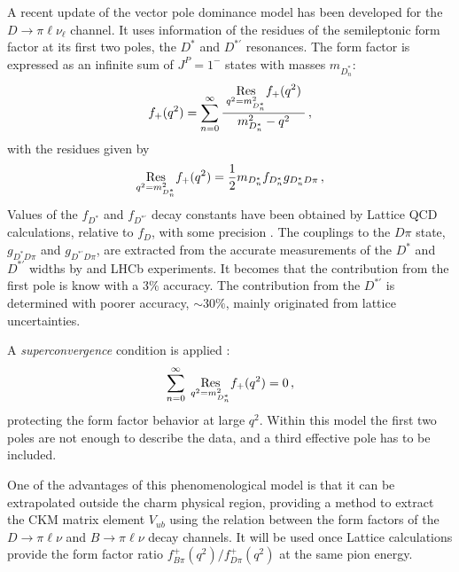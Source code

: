 A recent update of the vector pole dominance model has been developed for the $D \to \pi \ell \nu_\ell$ channel\cite{Becirevic:2014kaa}.
It uses information of the residues of the semileptonic form factor at its first two poles, the $D^\ast$ 
and $D^{\ast '}$ resonances.  
The form factor is expressed as an infinite sum of $J^P =1^-$ states with masses $m_{D^\ast_n}$: 
\begin{eqnarray}
f_+(q^2) = \sum_{n=0}^\infty { \; \displaystyle{\underset{q^2= m_{D^\ast_n}^2}{\rm Res}} f_+(q^2)\;\over m_{D^\ast_n}^2-q^2} \,,
\label{ThreePole}
\end{eqnarray}
with the residues given by 
\begin{eqnarray}
\displaystyle{\underset{q^2=m_{D_n^\ast}^2}{\rm Res}} f_+(q^2)= {1\over 2} m_{D_n^\ast} f_{D_n^\ast} g_{D_n^\ast D\pi}\,, 
\label{Residua}
\end{eqnarray}
Values of the $f_{D^\ast}$ and $f_{D^{\ast '}}$ decay constants have been obtained by Lattice QCD calculations, 
relative to $f_{D}$, with some precision  \cite{Becirevic:2014kaa}. 
The couplings to the $D\pi$ state, $g_{D^\ast D\pi}$ and $g_{D^{\ast '} D\pi}$, are extracted from the accurate 
measurements of the $D^\ast$ and  $D^{\ast '}$ widths by \babar and LHCb experiments. 
It becomes that the contribution from the first pole is know with a $3\%$ accuracy. 
The contribution from the $D^{\ast '}$ is determined with poorer accuracy, $\sim 30\%$, mainly originated
from lattice uncertainties.   

A {\it superconvergence} condition is applied \cite{Burdman:1996kr}: 
\begin{eqnarray}
\sum_{n=0}^\infty { \; \displaystyle{\underset{q^2=m_{D^\ast_n}^2}{\rm Res}} f_+(q^2) }= 0 \,,
\label{superconvergence}
\end{eqnarray}
protecting the form factor behavior at large $q^2$.
Within this model the first two poles are not enough to describe the data, and a third effective pole has to be included. 

One of the advantages of this phenomenological model 
is that it can be extrapolated outside the charm physical region, providing a method to 
extract the CKM matrix element $V_{ub}$ using the relation between the form factors of the 
$D\to \pi\ell \nu$ and $B\to \pi\ell \nu$ decay channels. It will be used once Lattice calculations provide
the form factor ratio $f^{+}_{B\pi}(q^2)/f^{+}_{D\pi}(q^2)$ at the same pion energy. 

